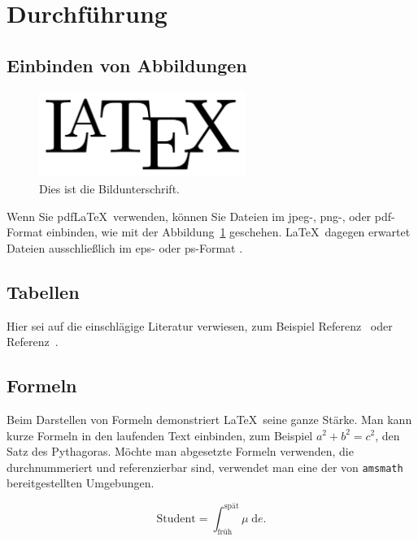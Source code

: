 \documentclass[
	fontsize=11pt,
	paper=a4,
	pagesize=auto,
	parskip=false,
	titlepage=on,
	ngerman
]{scrartcl}
\begin{document}
\section{Durchführung}

\subsection{Einbinden von Abbildungen}

\begin{figure}[htb]
	\centering
	\includegraphics[width=0.6\textwidth]{Bild}
	\caption{Dies ist die Bildunterschrift.}\label{Bild}
\end{figure}

Wenn Sie pdf\LaTeX\ verwenden, können Sie Dateien im jpeg-, png-, oder pdf-Format einbinden, wie mit der Abbildung~\ref{Bild} geschehen. \LaTeX\ dagegen erwartet Dateien ausschließlich im eps- oder ps-Format \cite{andyroberts}.

\subsection{Tabellen}

Hier sei auf die einschlägige Literatur verwiesen, zum Beispiel Referenz~\cite{andyroberts} oder Referenz~\cite{hobbits}.

\subsection{Formeln}

Beim Darstellen von Formeln demonstriert \LaTeX\ seine ganze Stärke. Man kann kurze Formeln in den laufenden Text einbinden, zum Beispiel $a^2+b^2=c^2$, den Satz des Pythagoras. Möchte man abgesetzte Formeln verwenden, die durchnummeriert und referenzierbar sind, verwendet man eine der von \texttt{amsmath} \cite[Table 3.1]{amsmath} bereitgestellten Umgebungen.

\begin{equation}
	\textrm{Student} = \int_\textrm{früh}^\textrm{spät} \mu \; \mathrm{d}e. \label{formel1}
\end{equation}
\end{document}
